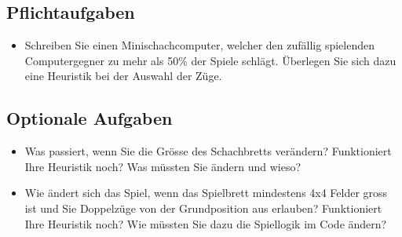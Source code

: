 \documentclass[a4paper,11pt,german,notitlepage]{report}
\begin{document}
\subsection*{Pflichtaufgaben}
\begin{itemize}
    \item Schreiben Sie einen Minischachcomputer, welcher den zufällig spielenden Computergegner zu mehr als 50\% der Spiele schlägt. Überlegen Sie sich dazu eine Heuristik bei der Auswahl der Züge.
\end{itemize}
\subsection*{Optionale Aufgaben}
\begin{itemize}
    \item Was passiert, wenn Sie die Grösse des Schachbretts verändern? Funktioniert Ihre Heuristik noch? Was müssten Sie ändern und wieso?
    \item Wie ändert sich das Spiel, wenn das Spielbrett mindestens 4x4 Felder gross ist und Sie Doppelzüge von der Grundposition aus erlauben? Funktioniert Ihre Heuristik noch? Wie müssten Sie dazu die Spiellogik im Code ändern?
\end{itemize}
\end{document}
